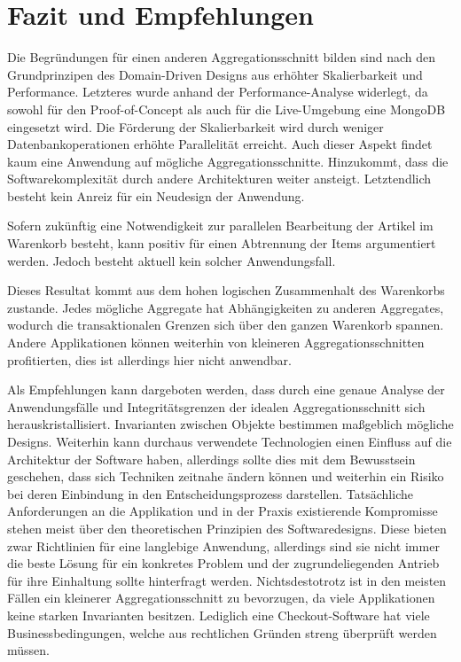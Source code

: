 

\chapter{Fazit und Empfehlungen}

Die Begründungen für einen anderen Aggregationsschnitt bilden sind nach den Grundprinzipen des Domain-Driven Designs aus erhöhter Skalierbarkeit und Performance. Letzteres wurde anhand der Performance-Analyse widerlegt, da sowohl für den Proof-of-Concept als auch für die Live-Umgebung eine MongoDB eingesetzt wird. Die Förderung der Skalierbarkeit wird durch weniger Datenbankoperationen erhöhte Parallelität erreicht. Auch dieser Aspekt findet kaum eine Anwendung auf mögliche Aggregationsschnitte. Hinzukommt, dass die Softwarekomplexität durch andere Architekturen weiter ansteigt. Letztendlich besteht kein Anreiz für ein Neudesign der Anwendung.

Sofern zukünftig eine Notwendigkeit zur parallelen Bearbeitung der Artikel im Warenkorb besteht, kann positiv für einen Abtrennung der Items argumentiert werden. Jedoch besteht aktuell kein solcher Anwendungsfall.

Dieses Resultat kommt aus dem hohen logischen Zusammenhalt des Warenkorbs zustande. Jedes mögliche Aggregate hat Abhängigkeiten zu anderen Aggregates, wodurch die transaktionalen Grenzen sich über den ganzen Warenkorb spannen. Andere Applikationen können weiterhin von kleineren Aggregationsschnitten profitierten, dies ist allerdings hier nicht anwendbar.

Als Empfehlungen kann dargeboten werden, dass durch eine genaue Analyse der Anwendungsfälle und Integritätsgrenzen der idealen Aggregationsschnitt sich herauskristallisiert. Invarianten zwischen Objekte bestimmen maßgeblich mögliche Designs. Weiterhin kann durchaus verwendete Technologien einen Einfluss auf die Architektur der Software haben, allerdings sollte dies mit dem Bewusstsein geschehen, dass sich Techniken zeitnahe ändern können und weiterhin ein Risiko bei deren Einbindung in den Entscheidungsprozess darstellen. Tatsächliche Anforderungen an die Applikation und in der Praxis existierende Kompromisse stehen meist über den theoretischen Prinzipien des Softwaredesigns. Diese bieten zwar Richtlinien für eine langlebige Anwendung, allerdings sind sie nicht immer die beste Lösung für ein konkretes Problem und der zugrundeliegenden Antrieb für ihre Einhaltung sollte hinterfragt werden. Nichtsdestotrotz ist in den meisten Fällen ein kleinerer Aggregationsschnitt zu bevorzugen, da viele Applikationen keine starken Invarianten besitzen. Lediglich eine Checkout-Software hat viele Businessbedingungen, welche aus rechtlichen Gründen streng überprüft werden müssen.
